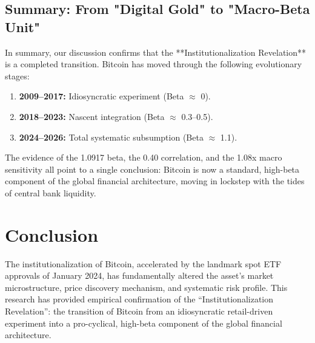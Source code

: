 \documentclass[10pt, conference, compsocconf]{IEEEtran}
\begin{document}

\subsection{Summary: From "Digital Gold" to "Macro-Beta Unit"}

In summary, our discussion confirms that the **Institutionalization Revelation** is a completed transition. Bitcoin has moved through the following evolutionary stages:
\begin{enumerate}
    \item \textbf{2009--2017:} Idiosyncratic experiment (Beta $\approx$ 0).
    \item \textbf{2018--2023:} Nascent integration (Beta $\approx$ 0.3--0.5).
    \item \textbf{2024--2026:} Total systematic subsumption (Beta $\approx$ 1.1).
\end{enumerate}
The evidence of the 1.0917 beta, the 0.40 correlation, and the 1.08x macro sensitivity all point to a single conclusion: Bitcoin is now a standard, high-beta component of the global financial architecture, moving in lockstep with the tides of central bank liquidity.



\section{Conclusion}

The institutionalization of Bitcoin, accelerated by the landmark spot ETF approvals of January 2024, has fundamentally altered the asset's market microstructure, price discovery mechanism, and systematic risk profile. This research has provided empirical confirmation of the ``Institutionalization Revelation'': the transition of Bitcoin from an idiosyncratic retail-driven experiment into a pro-cyclical, high-beta component of the global financial architecture.
\end{document}
